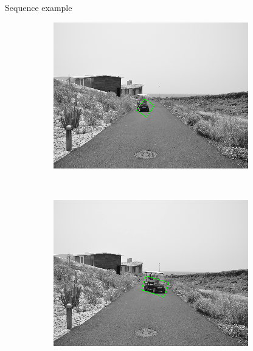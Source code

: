 \begin{frame}{Sequence example}
\begin{figure}[h!]
\begin{subfigure}[b]{0.24\columnwidth}
	  \includegraphics[width=\textwidth]{sequence/seq5}\label{fig:seq5}
      \end{subfigure}%
      ~
      \begin{subfigure}[b]{0.24\columnwidth}
	  \includegraphics[width=\textwidth]{sequence/seq6}\label{fig:seq6}
      \end{subfigure}%
      ~
      \begin{subfigure}[b]{0.24\columnwidth}

\end{subfigure}
\end{figure}
\end{frame}
